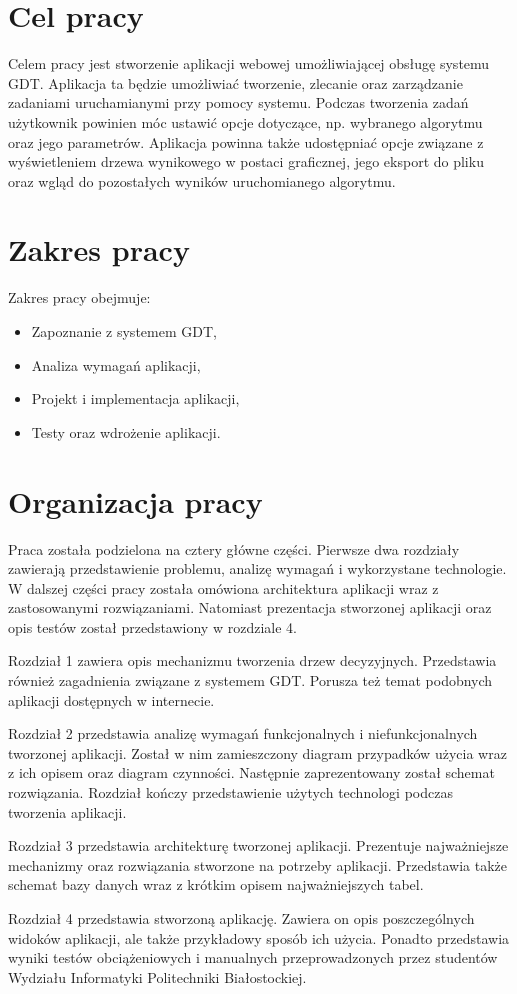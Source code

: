 \section*{Cel pracy}
Celem pracy jest stworzenie aplikacji webowej umożliwiającej obsługę systemu GDT. Aplikacja ta będzie umożliwiać tworzenie, zlecanie oraz zarządzanie zadaniami uruchamianymi przy pomocy systemu. Podczas tworzenia zadań użytkownik powinien móc ustawić opcje dotyczące, np. wybranego algorytmu oraz jego parametrów. Aplikacja powinna także udostępniać opcje związane z wyświetleniem drzewa wynikowego w postaci graficznej, jego eksport do pliku oraz wgląd do pozostałych wyników uruchomianego algorytmu.
\section*{Zakres pracy}
Zakres pracy obejmuje: 

\begin{itemize}
\item Zapoznanie z systemem GDT,
\item Analiza wymagań aplikacji,
\item Projekt i implementacja aplikacji, 
\item Testy oraz wdrożenie aplikacji.
\end{itemize}


\section*{Organizacja pracy}
Praca została podzielona na cztery główne części. Pierwsze dwa rozdziały zawierają przedstawienie problemu, analizę wymagań i wykorzystane technologie. W dalszej części pracy została omówiona architektura aplikacji wraz z zastosowanymi rozwiązaniami. Natomiast prezentacja stworzonej aplikacji oraz opis testów został przedstawiony w rozdziale 4.

Rozdział 1 zawiera opis mechanizmu tworzenia drzew decyzyjnych. Przedstawia również zagadnienia związane z systemem GDT. Porusza też temat podobnych aplikacji dostępnych w internecie.

Rozdział 2 przedstawia analizę wymagań funkcjonalnych i niefunkcjonalnych tworzonej aplikacji. Został w nim zamieszczony diagram przypadków użycia wraz z ich opisem oraz diagram czynności. Następnie zaprezentowany został schemat rozwiązania. Rozdział kończy przedstawienie użytych technologi podczas tworzenia aplikacji.

Rozdział 3 przedstawia architekturę tworzonej aplikacji. Prezentuje najważniejsze mechanizmy oraz rozwiązania stworzone na potrzeby aplikacji. Przedstawia także schemat bazy danych wraz z krótkim opisem najważniejszych tabel.

Rozdział 4 przedstawia stworzoną aplikację. Zawiera on opis poszczególnych widoków aplikacji, ale także przykładowy sposób ich użycia. Ponadto przedstawia wyniki testów obciążeniowych i manualnych przeprowadzonych przez studentów Wydziału Informatyki Politechniki Białostockiej.